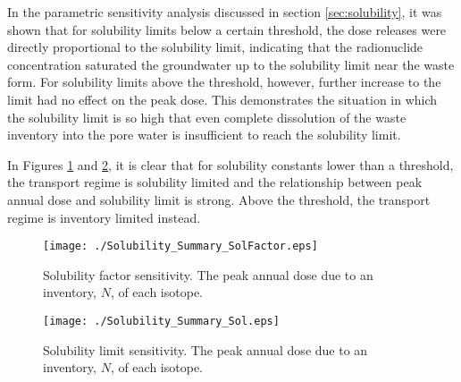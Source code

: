 In the parametric sensitivity analysis discussed in section 
\ref{sec:solubility}, it was shown that for solubility limits below a certain 
threshold, the dose releases were directly proportional to the solubility 
limit, indicating that the radionuclide concentration saturated the groundwater 
up to the solubility limit near the waste form.  For solubility limits above 
the threshold, however, further increase to the limit had no effect on the peak 
dose. This demonstrates the situation in which the solubility limit is so high 
that even complete dissolution of the waste inventory into the pore water is 
insufficient to reach the solubility limit.

In Figures \ref{fig:SolSumFactor} and \ref{fig:SolSum}, it is clear that for 
solubility constants lower than a threshold, the transport regime is solubility 
limited and the relationship between peak annual dose and solubility limit is 
strong.  Above the threshold, the transport regime is inventory limited 
instead.  

\begin{figure}[ht]
\centering
\texttt{[image: ./Solubility\_Summary\_SolFactor.eps]}
\caption[Solubility factor sensitivity in GDSM Clay model]{Solubility factor sensitivity. The peak annual dose due to an inventory, 
$N$, of each isotope.}
\label{fig:SolSumFactor}
\end{figure}

\begin{figure}[ht]
\centering
\texttt{[image: ./Solubility\_Summary\_Sol.eps]}
\caption[Solubility limit sensitivity in GDSM Clay model]{Solubility limit sensitivity. The peak annual dose due to an inventory, 
$N$, of each isotope.}
\label{fig:SolSum}
\end{figure}
\FloatBarrier
